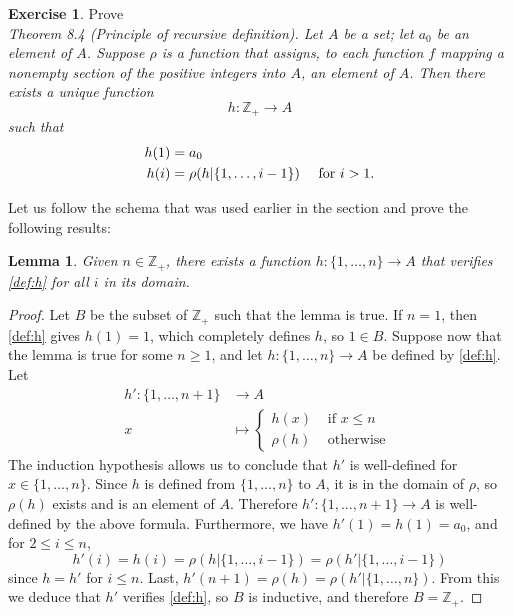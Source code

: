\documentclass[11pt,a4paper,twoside]{article}
\theoremstyle{definition}
\newcounter{excounter}
\newtheorem{exercise}[excounter]{Exercise}
\theoremstyle{plain}
\newtheorem{lemma}{Lemma}
\begin{document}
\begin{exercise}

  Prove \\
  \emph{Theorem 8.4 (Principle of recursive definition). \quad Let $A$ be a set; let $a_0$ be an element of $A$.
    Suppose $\rho$ is a function that assigns, to each function $f$ mapping a nonempty section of the positive integers into $A$,
    an element of $A$. Then there exists a unique function}
  \begin{equation*}
    h : \mathbb{Z}_+ \to A
  \end{equation*}
  \emph{such that}
  \begin{align} \label{def:h}
    h (1) &= a_0 \notag \\
    h (i) &= \rho ( h | \{ 1, \dotsc, i - 1 \} ) &\text{ for } i > 1.
  \end{align}

\end{exercise}

Let us follow the schema that was used earlier in the section and prove the following results:

\begin{lemma} \label{lemma:exists}
  Given $n \in \mathbb{Z}_+$, there exists a function $h : \{ 1, \dotsc, n \} \to A$ that verifies \eqref{def:h} for all $i$ in its domain.
\end{lemma}
\begin{proof}
  Let $B$ be the subset of $\mathbb{Z}_+$ such that the lemma is true. If $n = 1$, then \eqref{def:h} gives $h (1) = 1$, which completely
  defines $h$, so $1 \in B$. Suppose now that the lemma is true for some $n \geq 1$, and let $h : \{ 1, \dotsc, n \} \to A$ be defined by \eqref{def:h}.
  Let
  \begin{align*}
    h' : \{ 1, \dotsc, n + 1 \} &\to A \\
    x &\mapsto \begin{cases}
      h (x) &\text{ if } x \leq n \\
      \rho ( h ) &\text{ otherwise }
    \end{cases}
  \end{align*}
  The induction hypothesis allows us to conclude that $h'$ is well-defined for $x \in \{ 1, \dotsc, n \}$. Since $h$ is defined from $\{ 1, \dotsc, n \}$ to $A$,
  it is in the domain of $\rho$, so $\rho (h)$ exists and is an element of $A$. Therefore $h' : \{ 1, \dotsc, n + 1 \} \to A$ is well-defined by the above formula.
  Furthermore, we have $h' (1) = h (1) = a_0$, and for $2 \leq i \leq n$,
  \begin{equation*}
    h' (i) = h (i) = \rho (h | \{ 1, \dotsc, i - 1 \}) = \rho ( h' | \{ 1, \dotsc, i - 1 \} )
  \end{equation*}
  since $h = h'$ for $i \leq n$. Last, $h' (n + 1) = \rho (h) = \rho (h' | \{ 1, \dotsc, n \})$. From this we deduce that $h'$ verifies \eqref{def:h},
  so $B$ is inductive, and therefore $B = \mathbb{Z}_+$.
\end{proof}
\end{document}
